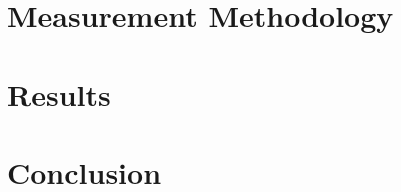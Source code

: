 \documentclass[12pt]{article}
\begin{document}
\pagebreak

\section{Measurement Methodology}

\section{Results}



\section{Conclusion}



\pagebreak

\begin{thebibliography}{99}
\end{thebibliography}
\end{document}
